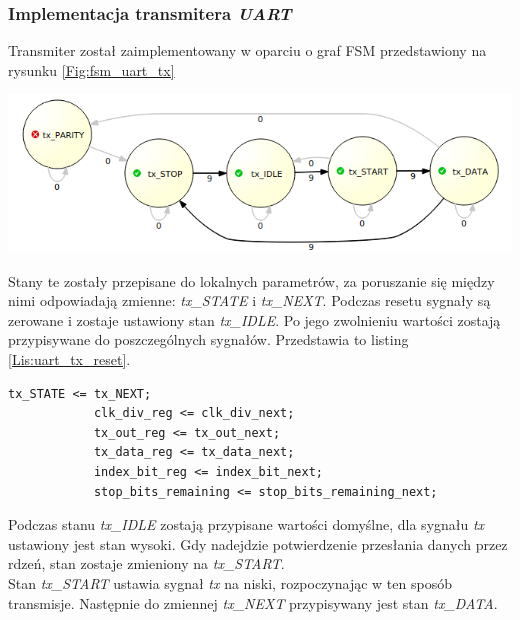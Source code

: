 \documentclass[11pt,a4paper]{article}
\begin{document}
	\subsubsection{Implementacja transmitera \textit{UART}}
	Transmiter został zaimplementowany w oparciu o graf FSM przedstawiony na rysunku \ref{Fig:fsm_uart_tx}\\
				\begin{minipage}[c]{\textwidth}
					\includegraphics[width=\textwidth]{./rysunki/uart_tx_fsm.png}
			\end{minipage}
		Stany te zostały przepisane do lokalnych parametrów, za poruszanie się między nimi odpowiadają zmienne: \textit{tx\_STATE} i \textit{tx\_NEXT}. Podczas resetu sygnały są zerowane i zostaje ustawiony stan \textit{tx\_IDLE}. Po jego zwolnieniu wartości zostają przypisywane do poszczególnych sygnałów. Przedstawia to listing \ref{Lis:uart_tx_reset}.\\
\begin{minipage}{\textwidth}
\begin{scriptsize}
\begin{lstlisting}[label=Lis:uart_tx_reset,caption=Transmiter \textit{UART} po resecie]
			tx_STATE <= tx_NEXT;
			clk_div_reg <= clk_div_next;
			tx_out_reg <= tx_out_next;
			tx_data_reg <= tx_data_next;
			index_bit_reg <= index_bit_next;
			stop_bits_remaining <= stop_bits_remaining_next;
\end{lstlisting}
\end{scriptsize}
\end{minipage}
Podczas stanu \textit{tx\_IDLE} zostają przypisane wartości domyślne, dla sygnału \textit{tx} ustawiony jest stan wysoki. Gdy nadejdzie potwierdzenie przesłania danych przez rdzeń, stan zostaje zmieniony na \textit{tx\_START}.\\
Stan \textit{tx\_START} ustawia sygnał \textit{tx} na niski, rozpoczynając w ten sposób transmisje. Następnie do zmiennej \textit{tx\_NEXT} przypisywany jest stan \textit{tx\_DATA}.\\
\end{document}
